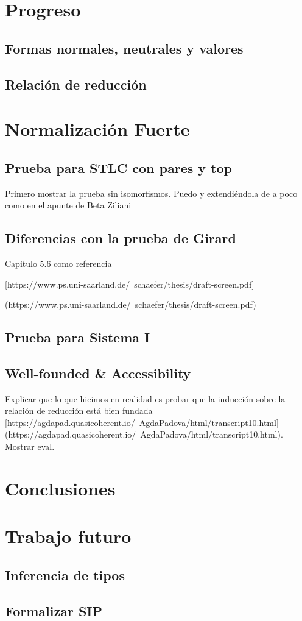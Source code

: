 \documentclass[]{report}
\begin{document}
\section{Progreso}

\subsection{Formas normales, neutrales y valores}
\subsection{Relación de reducción}

\section{Normalización Fuerte}

\subsection{Prueba para STLC con pares y top}
Primero mostrar la prueba sin isomorfismos. Puedo y extendiéndola de a poco como en el apunte de Beta Ziliani
\subsection{Diferencias con la prueba de Girard}
Capitulo 5.6 como referencia

[https://www.ps.uni-saarland.de/~schaefer/thesis/draft-screen.pdf] 

(https://www.ps.uni-saarland.de/~schaefer/thesis/draft-screen.pdf)
\subsection{Prueba para Sistema I}
\subsection{Well-founded \& Accessibility}
Explicar que lo que hicimos en realidad es probar que la inducción sobre la relación de reducción está bien fundada [https://agdapad.quasicoherent.io/~AgdaPadova/html/transcript10.html] (https://agdapad.quasicoherent.io/~AgdaPadova/html/transcript10.html). Mostrar eval.

\section{Conclusiones}


\section{Trabajo futuro}
\subsection{Inferencia de tipos}
\subsection{Formalizar SIP}


\printbibliography
\end{document}
